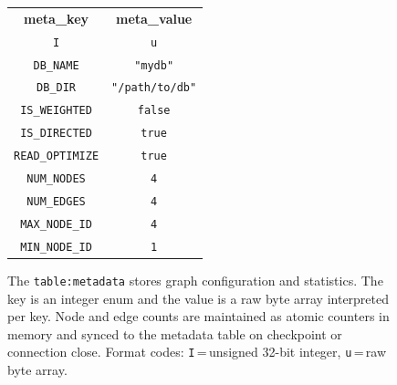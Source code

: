 \begin{figure}[t]
  \centering
  \footnotesize
  \begin{tabular}{|c|c|}
    \hline
    \textbf{meta\_key} & \textbf{meta\_value} \\
    \texttt{I} & \texttt{u} \\
    \hline
    \texttt{DB\_NAME}       & \texttt{"mydb"} \\
    \texttt{DB\_DIR}        & \texttt{"/path/to/db"} \\
    \texttt{IS\_WEIGHTED}   & \texttt{false} \\
    \texttt{IS\_DIRECTED}   & \texttt{true} \\
    \texttt{READ\_OPTIMIZE} & \texttt{true} \\
    \texttt{NUM\_NODES}     & \texttt{4} \\
    \texttt{NUM\_EDGES}     & \texttt{4} \\
    \texttt{MAX\_NODE\_ID}  & \texttt{4} \\
    \texttt{MIN\_NODE\_ID}  & \texttt{1} \\
    \hline
  \end{tabular}
  \caption{The \texttt{table:metadata} stores graph configuration and statistics.
    The key is an integer enum and the value is a raw byte array interpreted per key.
    Node and edge counts are maintained as atomic counters in memory and synced to the metadata table on checkpoint or connection close.
    Format codes: \texttt{I}\,=\,unsigned 32-bit integer, \texttt{u}\,=\,raw byte array.}
  \label{fig:schema:metadata}
\end{figure}
